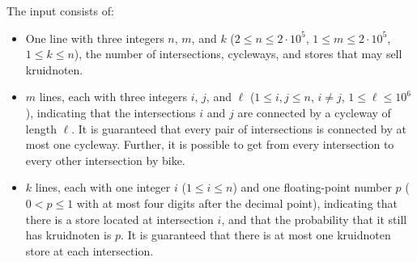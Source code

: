 
    The input consists of:
    \begin{itemize}
    \item One line with three integers $n$, $m$, and $k$ ($2\leq n\leq 2 \cdot 10^5$, $1\leq m\leq 2 \cdot 10^5$, $1\leq k\leq n$), the number of
    intersections, cycleways, and stores that may sell kruidnoten.
    \item $m$ lines, each with three integers $i$, $j$, and $\ell$ ($1\leq i, j\leq n$, $i \neq j$, $1 \leq \ell \leq 10^6$), indicating that the intersections $i$ and $j$ are connected by a cycleway of length $\ell$.
    It is guaranteed that every pair of intersections is connected by at most one cycleway.
    Further, it is possible to get from every intersection to every other intersection by bike.
    \item $k$ lines, each with one integer $i$ ($1\leq i \leq n$) and one floating-point number $p$ ($0 < p \leq 1$ with at most four digits after the decimal point), indicating that there is a store located at intersection $i$, and that the probability that it still has kruidnoten is $p$.
    It is guaranteed that there is at most one kruidnoten store at each intersection.
    \end{itemize}

